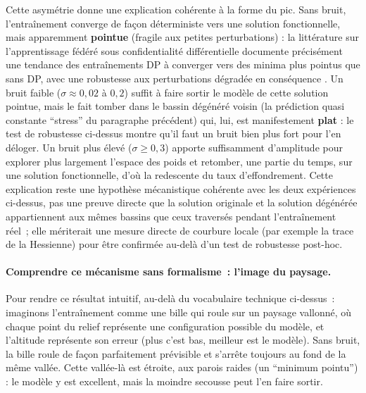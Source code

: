 \documentclass{acmart}
\begin{document}
Cette asymétrie donne une explication cohérente à la forme du pic. Sans
bruit, l'entraînement converge de façon déterministe vers une solution
fonctionnelle, mais apparemment \textbf{pointue} (fragile aux petites
perturbations) : la littérature sur l'apprentissage fédéré sous
confidentialité différentielle documente précisément une tendance des
entraînements DP à converger vers des minima plus pointus que sans DP,
avec une robustesse aux perturbations dégradée en conséquence
\cite{shi2023make,wu2024fedpgn}. Un bruit faible ($\sigma \approx 0{,}02$
à $0{,}2$) suffit à faire sortir le modèle de cette solution pointue, mais
le fait tomber dans le bassin dégénéré voisin (la prédiction quasi
constante ``stress'' du paragraphe précédent) qui, lui, est manifestement
\textbf{plat} : le test de robustesse ci-dessus montre qu'il faut un bruit
bien plus fort pour l'en déloger. Un bruit plus élevé ($\sigma \geq 0{,}3$)
apporte suffisamment d'amplitude pour explorer plus largement l'espace des
poids et retomber, une partie du temps, sur une solution fonctionnelle,
d'où la redescente du taux d'effondrement. Cette explication reste une
hypothèse mécanistique cohérente avec les deux expériences ci-dessus, pas
une preuve directe que la solution originale et la solution dégénérée
appartiennent aux mêmes bassins que ceux traversés pendant l'entraînement
réel~; elle mériterait une mesure directe de courbure locale (par exemple
la trace de la Hessienne) pour être confirmée au-delà d'un test de
robustesse post-hoc.

\paragraph{Comprendre ce mécanisme sans formalisme~: l'image du paysage.}
Pour rendre ce résultat intuitif, au-delà du vocabulaire technique
ci-dessus~: imaginons l'entraînement comme une bille qui roule sur un
paysage vallonné, où chaque point du relief représente une configuration
possible du modèle, et l'altitude représente son erreur (plus c'est bas,
meilleur est le modèle). Sans bruit, la bille roule de façon parfaitement
prévisible et s'arrête toujours au fond de la même vallée. Cette
vallée-là est étroite, aux parois raides (un ``minimum pointu'') : le
modèle y est excellent, mais la moindre secousse peut l'en faire sortir.
\end{document}
